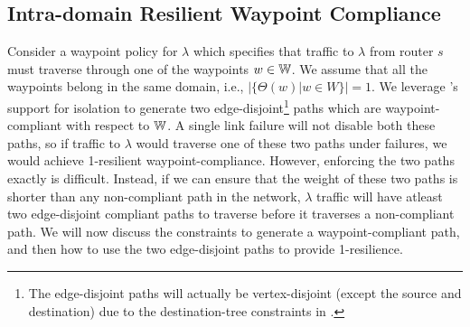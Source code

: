 
%









\subsection{Intra-domain Resilient Waypoint Compliance}\label{sec:ospfwaypoint}
Consider a waypoint policy for $\lambda$ which
specifies that traffic to $\lambda$ from router $s$ 
must traverse through
one of the waypoints $w \in \mathbb{W}$. We assume that 
all the waypoints belong in the same domain, i.e., 
$|\{\Theta(w) | w \in W\}| = 1$.
We leverage \genesis's
support for isolation to generate two edge-disjoint\footnote
{The edge-disjoint paths will actually be vertex-disjoint (except the 
	source and destination) due to the destination-tree constraints
	in \genesis.} paths
which are waypoint-compliant with respect to $\mathbb{W}$. A single link
failure will not disable both these paths, so if traffic to $\lambda$ 
would 
traverse one of these two paths under failures, 
we would achieve 1-resilient
waypoint-compliance. However, enforcing the two paths exactly
is difficult. Instead, if we can ensure that the weight
of these two paths is shorter than any non-compliant path in 
the network, $\lambda$ traffic will have atleast two edge-disjoint 
compliant paths to traverse 
before it traverses a non-compliant path. We will now discuss the
constraints to generate a waypoint-compliant path, and then 
how to use the two edge-disjoint paths to provide 1-resilience. 


